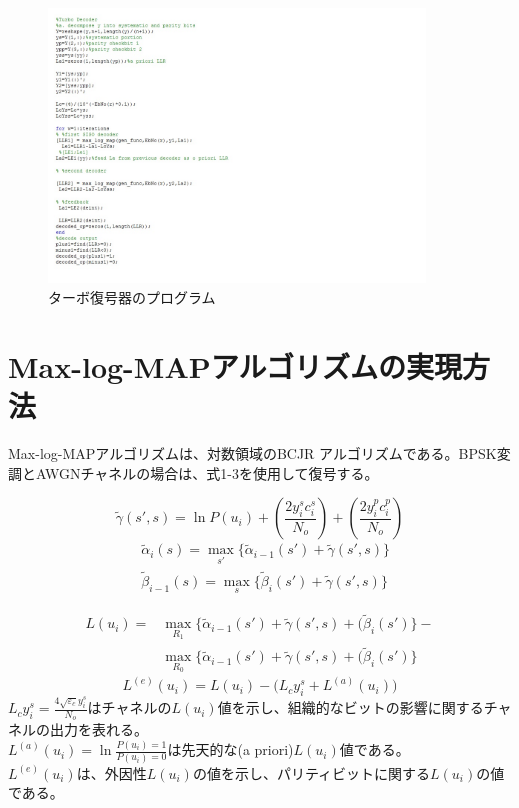 \documentclass[20 pts]{article}
\begin{document}
\begin{figure}[h!]
\includegraphics[width=10cm]{zu6.jpg}
\caption{ターボ復号器のプログラム}
\label{図2}
\end{figure}

\section{Max-log-MAPアルゴリズムの実現方法}
Max-log-MAPアルゴリズムは、対数領域のBCJR アルゴリズムである。BPSK変調とAWGNチャネルの場合は、式1-3を使用して復号する。

\begin{equation}\widetilde{\gamma}(s',s)= \ln P(u_i)+(\frac{2y_i^sc_i^s}{N_o})+(\frac{2y_i^pc_i^p}{N_o})\end{equation}
\begin{equation}
\begin{split}
&\widetilde{\alpha}_i(s)=\max_{s'}\{\widetilde{\alpha}_{i-1}(s')+\widetilde{\gamma}(s',s)\}\\
&\widetilde{\beta}_{i-1}(s)=\max_{s}\{\widetilde{\beta}_{i}(s')+\widetilde{\gamma}(s',s)\}
\end{split}
\end{equation}

\begin{equation}
\begin{split}
L(u_i)=&\max_{R_1}\Big\{\widetilde{\alpha}_{i-1}(s')+\widetilde{\gamma}(s',s)+(\widetilde{\beta}_{i}(s')\Big\}-\\&\max_{R_0}\Big\{\widetilde{\alpha}_{i-1}(s')+\widetilde{\gamma}(s',s)+(\widetilde{\beta}_{i}(s')\Big\}
\end{split}
\end{equation}
\begin{equation}L^{(e)}(u_i)=L(u_i)-\Big(L_cy_i^s+L^{(a)}(u_i)\Big)\end{equation}
$L_cy_i^s=\frac{4\sqrt{\varepsilon_c}y_i^s}{N_o}$はチャネルの$L(u_i)$値を示し、組織的なビットの影響に関するチャネルの出力を表れる。\\
$L^{(a)}(u_i)=\ln\frac{P(u_i)=1}{P(u_i)=0}$は先天的な(a priori)$ L(u_i)$値である。\\
$L^{(e)}(u_i)$は、外因性$L(u_i)$の値を示し、パリティビットに関する$L(u_i)$の値である。
\end{document}
